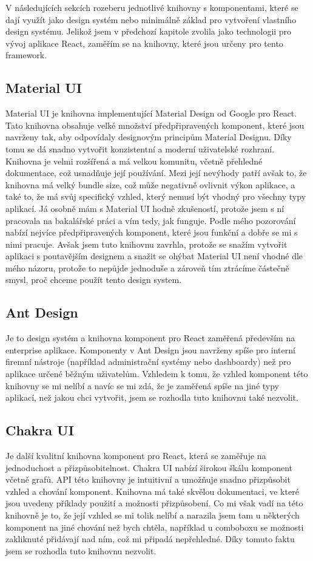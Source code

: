 V následujících sekcích rozeberu jednotlivé knihovny s komponentami, které se dají využít jako design systém nebo minimálně základ pro vytvoření vlastního design systému.
Jelikož jsem v předchozí kapitole zvolila jako technologii pro vývoj aplikace React, zaměřím se na knihovny, které jsou určeny pro tento framework. 

\subsection{Material UI}
Material UI je knihovna implementující Material Design od Google pro React. Tato knihovna obsahuje velké množství předpřipravených komponent, které jsou navrženy tak, aby odpovídaly designovým principům Material Designu. Díky tomu se dá snadno vytvořit konzistentní a moderní uživatelské rozhraní. Knihovna je velmi rozšířená a má velkou komunitu, včetně přehledné dokumentace, což usnadňuje její používání. Mezi její nevýhody patří avšak to, že knihovna má velký bundle size, což může negativně ovlivnit výkon aplikace, a také to, že má svůj specifický vzhled, který nemusí být vhodný pro všechny typy aplikací. Já osobně mám s Material UI hodně zkušeností, protože jsem s ní pracovala na bakalářské práci a vím tedy, jak funguje. Podle mého pozorování nabízí nejvíce předpřipravených komponent, které jsou funkční a dobře se mi s nimi pracuje. Avšak jsem tuto knihovnu zavrhla, protože se snažím vytvořit aplikaci s poutavějším designem a snažit se ohýbat Material UI není vhodné dle mého názoru, protože to nepůjde jednoduše a zároveň tím ztrácíme částečně smysl, proč chceme použít tento design system. \cite{reactUILibraries}

\subsection{Ant Design}
Je to design systém a knihovna komponent pro React zaměřená především na enterprise aplikace. Komponenty v Ant Design jsou navrženy spíše pro interní firemní nástroje (například administrační systémy nebo dashboardy) než pro aplikace určené běžným uživatelům.
Vzhledem k tomu, že vzhled komponent této knihovny se mi nelíbí a navíc se mi zdá, že je zaměřená spíše na jiné typy aplikací, než jakou chci vytvořit, jsem se rozhodla tuto knihovnu také nezvolit. \cite{reactUILibraries}

\subsection{Chakra UI}
Je další kvalitní knihovna komponent pro React, která se zaměřuje na jednoduchost a přizpůsobitelnost. Chakra UI nabízí širokou škálu komponent včetně grafů. API této knihovny je intuitivní a umožňuje snadno přizpůsobit vzhled a chování komponent. Knihovna má také skvělou dokumentaci, ve které jsou uvedeny příklady použití a možnosti přizpůsobení. Co mi však vadí na této knihovně je to, že její vzhled se mi tolik nelíbí a narazila jsem tam u některých komponent na jiné chování než bych chtěla, například u comboboxu se možnosti zakliknuté přidávají nad ním, což mi připadá nepřehledné. Díky tomuto faktu jsem se rozhodla tuto knihovnu nezvolit. \cite{reactUILibraries}

